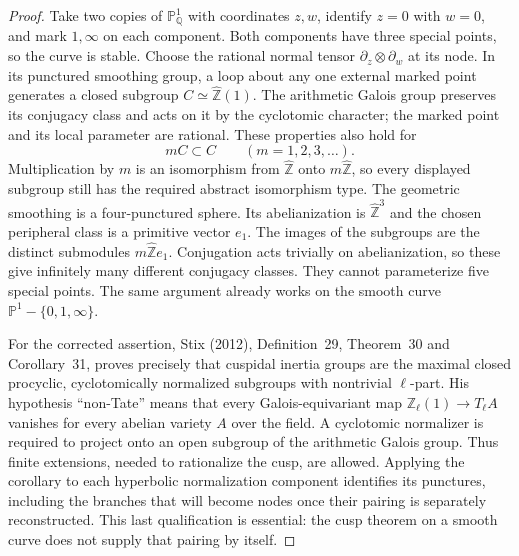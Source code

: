 \begin{proof}
Take two copies of $\mathbb P^1_{\mathbb Q}$ with coordinates $z,w$,
identify $z=0$ with $w=0$, and mark $1,\infty$ on each component.
Both components have three special points, so the curve is stable.
Choose the rational normal tensor
$\partial_z\otimes\partial_w$ at its node. In its punctured
smoothing group, a loop about any one external marked point generates
a closed subgroup $C\simeq\widehat{\mathbb Z}(1)$. The arithmetic
Galois group preserves its conjugacy class and acts on it by the
cyclotomic character; the marked point and its local parameter are
rational. These properties also hold for
\[
 mC\subset C\qquad(m=1,2,3,\ldots).
\]
Multiplication by $m$ is an isomorphism from $\widehat{\mathbb Z}$
onto $m\widehat{\mathbb Z}$, so every displayed subgroup still has
the required abstract isomorphism type. The geometric smoothing is
a four-punctured sphere. Its abelianization is
$\widehat{\mathbb Z}^{3}$ and the chosen peripheral class is a
primitive vector $e_1$. The images of the subgroups are the distinct
submodules $m\widehat{\mathbb Z}e_1$. Conjugation acts trivially on
abelianization, so these give infinitely many different conjugacy
classes. They cannot parameterize five special points. The same
argument already works on the smooth curve
$\mathbb P^1-\{0,1,\infty\}$.

For the corrected assertion, Stix (2012), Definition~29,
Theorem~30 and Corollary~31, proves precisely that cuspidal inertia
groups are the maximal closed procyclic, cyclotomically normalized
subgroups with nontrivial $\ell$-part. His hypothesis ``non-Tate''
means that every Galois-equivariant map
$\mathbb Z_\ell(1)\to T_\ell A$ vanishes for every abelian variety
$A$ over the field. A cyclotomic normalizer is required to project
onto an open subgroup of the arithmetic Galois group. Thus finite
extensions, needed to rationalize the cusp, are allowed. Applying the
corollary to each hyperbolic normalization component identifies its
punctures, including the branches that will become nodes once their
pairing is separately reconstructed. This last qualification is
essential: the cusp theorem on a smooth curve does not supply that
pairing by itself.
\end{proof}

